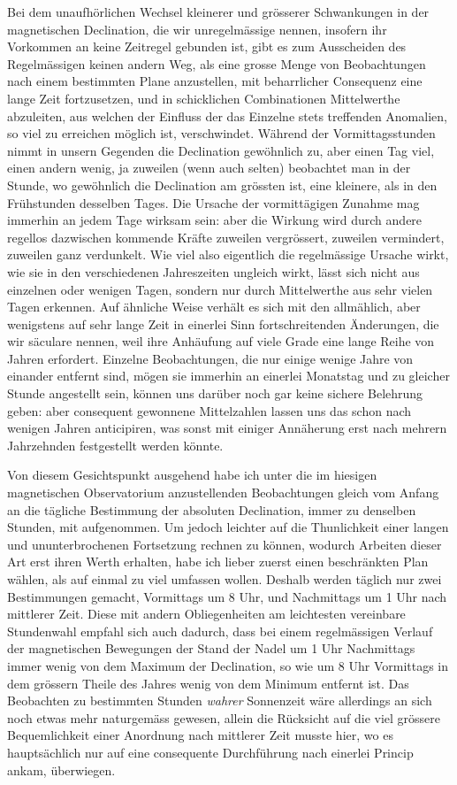 Bei dem unaufhörlichen Wechsel kleinerer und grösserer Schwankungen in der magnetischen Declination, die wir unregelmässige nennen, insofern ihr Vorkommen an keine Zeitregel gebunden ist, gibt es zum Ausscheiden des Regelmässigen keinen andern Weg, als eine grosse Menge von Beobachtungen nach einem bestimmten Plane anzustellen, mit beharrlicher Consequenz eine lange Zeit fortzusetzen, und in schicklichen Combinationen Mittelwerthe abzuleiten, aus welchen der Einfluss der das Einzelne stets treffenden Anomalien, so viel zu erreichen möglich ist, verschwindet. Während der Vormittagsstunden nimmt in unsern Gegenden die Declination gewöhnlich zu, aber einen Tag viel, einen andern wenig, ja zuweilen (wenn auch selten) beobachtet man in der Stunde, wo gewöhnlich die Declination am grössten ist, eine kleinere, als in den Frühstunden desselben Tages. Die Ursache der vormittägigen Zunahme mag immerhin an jedem Tage wirksam sein: aber die Wirkung wird durch andere regellos dazwischen kommende Kräfte zuweilen vergrössert, zuweilen vermindert, zuweilen ganz verdunkelt. Wie viel also eigentlich die regelmässige Ursache wirkt, wie sie in den verschiedenen Jahreszeiten ungleich wirkt, lässt sich nicht aus einzelnen oder wenigen Tagen, sondern nur durch Mittelwerthe aus sehr vielen Tagen
erkennen. Auf ähnliche Weise verhält es sich mit den allmählich, aber wenigstens auf sehr lange Zeit in einerlei Sinn fortschreitenden Änderungen, die wir säculare nennen, weil ihre Anhäufung auf viele Grade eine lange Reihe von Jahren erfordert. Einzelne Beobachtungen, die nur einige wenige Jahre von einander entfernt sind, mögen sie immerhin an einerlei Monatstag und zu gleicher Stunde angestellt sein, können uns darüber noch gar keine sichere Belehrung geben: aber consequent gewonnene Mittelzahlen lassen uns das schon nach wenigen Jahren anticipiren, was sonst mit einiger Annäherung erst nach mehrern Jahrzehnden festgestellt werden könnte.

Von diesem Gesichtspunkt ausgehend habe ich unter die im hiesigen magnetischen Observatorium anzustellenden Beobachtungen gleich vom Anfang an die tägliche Bestimmung der absoluten Declination, immer zu denselben Stunden, mit aufgenommen. Um jedoch leichter auf die Thunlichkeit einer langen und ununterbrochenen Fortsetzung rechnen zu können, wodurch Arbeiten dieser Art erst ihren Werth erhalten, habe ich lieber zuerst einen beschränkten Plan wählen, als auf einmal zu viel umfassen wollen. Deshalb werden täglich nur zwei Bestimmungen gemacht, Vormittags um 8 Uhr, und Nachmittags um 1 Uhr nach mittlerer Zeit. Diese mit andern Obliegenheiten am leichtesten vereinbare Stundenwahl empfahl sich auch dadurch, dass bei einem regelmässigen Verlauf der magnetischen Bewegungen der Stand der Nadel um 1 Uhr Nachmittags immer wenig von dem Maximum der Declination, so wie um 8 Uhr Vormittags in dem grössern Theile des Jahres wenig von dem Minimum entfernt ist. Das Beobachten zu bestimmten Stunden \textit{wahrer} Sonnenzeit wäre allerdings an sich noch etwas mehr naturgemäss gewesen, allein die Rücksicht auf die viel grössere Bequemlichkeit einer Anordnung nach mittlerer Zeit musste hier, wo es hauptsächlich nur auf eine consequente Durchführung nach einerlei Princip ankam, überwiegen.

